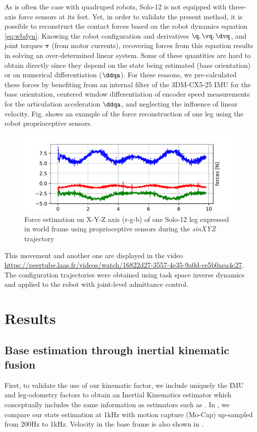 As is often the case with quadruped robots, Solo-12 is not equipped with three-axis force sensors at its feet. 
Yet, in order to validate the present method, it is possible to reconstruct the contact forces based on the robot dynamics 
equation \eqref{eq:wbdyn}. Knowing the robot configuration and derivatives $\q,\vq,\dvq$, and joint torques $\bm\tau$ (from motor currents), 
recovering forces from this equation results in solving an over-determined linear system. Some of these quantities are hard to obtain directly 
since they depend on the state being estimated (\eg base orientation) or on numerical differentiation ($\ddqa$). For these reasons, we pre-calculated 
these forces by benefiting from an internal filter of the 3DM-CX5-25 IMU for the base orientation, centered window differentiation of encoder speed 
measurements for the articulation acceleration $\ddqa$, and neglecting the influence of linear velocity. Fig.  shows an example of 
the force reconstruction of one leg using the robot proprioceptive sensors.
%
\begin{figure}
    \centering
    \includegraphics[width=0.9\columnwidth]{figures/centroidal/forces_solo_1leg.pdf}
    \caption{Force estimation on X-Y-Z axis (r-g-b) of one Solo-12 leg expressed in world frame using proprioceptive sensors during the \textit{sinXYZ} trajectory}
    \label{fig:force_est}
\end{figure}

This movement and another one are displayed in the video \url{https://peertube.laas.fr/videos/watch/16822d27-3557-4e35-9a0d-ce5b0aea4c27}.
The configuration trajectories were obtained using task space inverse dynamics \cite{adelprete:jnrh:2016} and applied to the robot with joint-level admittance control.


\section{Results}

\subsection{Base estimation through inertial kinematic fusion}
First, to validate the use of our kinematic factor, we include uniquely the IMU and leg-odometry factors to obtain an Inertial Kinematics estimator which 
conceptually includes the same information as estimators such as \cite{bloesch2013state}. In , we compare our state estimation 
at 1kHz with motion capture (Mo-Cap) up-sampled from 200Hz to 1kHz.
Velocity in the base frame is also shown in .

